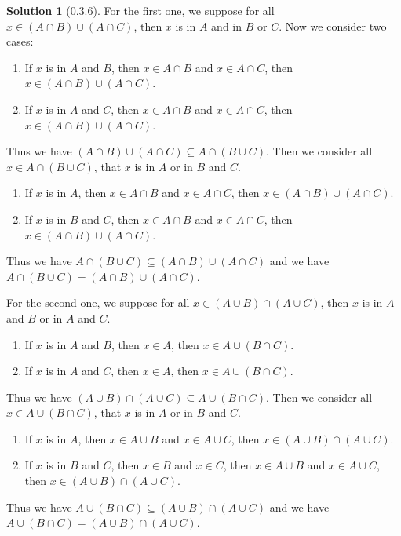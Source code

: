 \documentclass{article}
\theoremstyle{definition}
\newtheorem{sol}{Solution}[exe]
\begin{document}
\begin{sol}[0.3.6]
For the first one, we suppose for all $x\in (A\cap B)\cup (A\cap C)$, then $x$ is in $A$ and in $B$ or $C$.
Now we consider two cases:
\begin{enumerate}
    \item If $x$ is in $A$ and $B$, then $x\in A\cap B$ and $x\in A\cap C$, then $x\in (A\cap B)\cup (A\cap C)$.
    \item If $x$ is in $A$ and $C$, then $x\in A\cap B$ and $x\in A\cap C$, then $x\in (A\cap B)\cup (A\cap C)$.
\end{enumerate}
Thus we have $(A\cap B)\cup (A\cap C)\subseteq A\cap (B\cup C)$.
Then we consider all $x\in A\cap (B\cup C)$, that $x$ is in $A$ or in $B$ and $C$.
\begin{enumerate}
    \item If $x$ is in $A$, then $x\in A\cap B$ and $x\in A\cap C$, then $x\in (A\cap B)\cup (A\cap C)$.
    \item If $x$ is in $B$ and $C$, then $x\in A\cap B$ and $x\in A\cap C$, then $x\in (A\cap B)\cup (A\cap C)$.
\end{enumerate}
Thus we have $A\cap (B\cup C)\subseteq (A\cap B)\cup (A\cap C)$ and we have $ A\cap (B\cup C)=(A\cap B)\cup (A\cap C)$.

For the second one, we suppose for all $x\in (A\cup B)\cap (A\cup C)$, then $x$ is in $A$ and $B$ or in $A$ and $C$.
\begin{enumerate}
    \item If $x$ is in $A$ and $B$, then $x\in A$, then $x\in A\cup (B\cap C)$.
    \item If $x$ is in $A$ and $C$, then $x\in A$, then $x\in A\cup (B\cap C)$.
\end{enumerate}
Thus we have $(A\cup B)\cap (A\cup C)\subseteq A\cup (B\cap C)$.
Then we consider all $x\in A\cup (B\cap C)$, that $x$ is in $A$ or in $B$ and $C$.
\begin{enumerate}
    \item If $x$ is in $A$, then $x\in A\cup B$ and $x\in A\cup C$, then $x\in (A\cup B)\cap (A\cup C)$.
    \item If $x$ is in $B$ and $C$, then $x\in B$ and $x\in C$, then $x\in A\cup B$ and $x\in A\cup C$, then $x\in (A\cup B)\cap (A\cup C)$.
\end{enumerate}
Thus we have $A\cup (B\cap C)\subseteq (A\cup B)\cap (A\cup C)$ and we have $ A\cup (B\cap C)=(A\cup B)\cap (A\cup C)$.
\end{sol}
\end{document}
